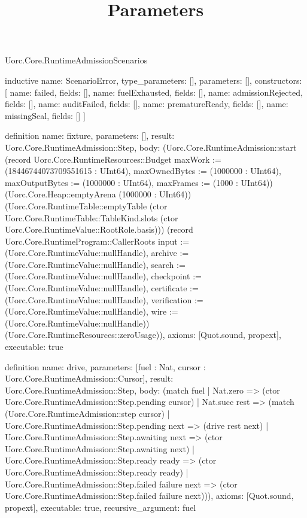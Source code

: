 \begin{lexlean}{Uorc.Core.RuntimeAdmissionScenarios}
\title{Parameters}
\begin{semanticmodule}
inductive{
  name: ScenarioError,
  type_parameters: [],
  parameters: [],
  constructors: [
    {name: failed, fields: []},
    {name: fuelExhausted, fields: []},
    {name: admissionRejected, fields: []},
    {name: auditFailed, fields: []},
    {name: prematureReady, fields: []},
    {name: missingSeal, fields: []}
  ]
}

definition{
  name: fixture,
  parameters: [],
  result: Uorc.Core.RuntimeAdmission::Step,
  body: (Uorc.Core.RuntimeAdmission::start (record Uorc.Core.RuntimeResources::Budget {maxWork := (18446744073709551615 : UInt64), maxOwnedBytes := (1000000 : UInt64), maxOutputBytes := (1000000 : UInt64), maxFrames := (1000 : UInt64)}) (Uorc.Core.Heap::emptyArena (1000000 : UInt64)) (Uorc.Core.RuntimeTable::emptyTable (ctor Uorc.Core.RuntimeTable::TableKind.slots (ctor Uorc.Core.RuntimeValue::RootRole.basis))) (record Uorc.Core.RuntimeProgram::CallerRoots {input := (Uorc.Core.RuntimeValue::nullHandle), archive := (Uorc.Core.RuntimeValue::nullHandle), search := (Uorc.Core.RuntimeValue::nullHandle), checkpoint := (Uorc.Core.RuntimeValue::nullHandle), certificate := (Uorc.Core.RuntimeValue::nullHandle), verification := (Uorc.Core.RuntimeValue::nullHandle), wire := (Uorc.Core.RuntimeValue::nullHandle)}) (Uorc.Core.RuntimeResources::zeroUsage)),
  axioms: [Quot.sound, propext],
  executable: true
}

definition{
  name: drive,
  parameters: [fuel : Nat, cursor : Uorc.Core.RuntimeAdmission::Cursor],
  result: Uorc.Core.RuntimeAdmission::Step,
  body: (match fuel
    | Nat.zero => (ctor Uorc.Core.RuntimeAdmission::Step.pending cursor)
    | Nat.succ rest => (match (Uorc.Core.RuntimeAdmission::step cursor)
      | Uorc.Core.RuntimeAdmission::Step.pending next => (drive rest next)
      | Uorc.Core.RuntimeAdmission::Step.awaiting next => (ctor Uorc.Core.RuntimeAdmission::Step.awaiting next)
      | Uorc.Core.RuntimeAdmission::Step.ready ready => (ctor Uorc.Core.RuntimeAdmission::Step.ready ready)
      | Uorc.Core.RuntimeAdmission::Step.failed failure next => (ctor Uorc.Core.RuntimeAdmission::Step.failed failure next))),
  axioms: [Quot.sound, propext],
  executable: true,
  recursive_argument: fuel
}


\end{semanticmodule}
\end{lexlean}
